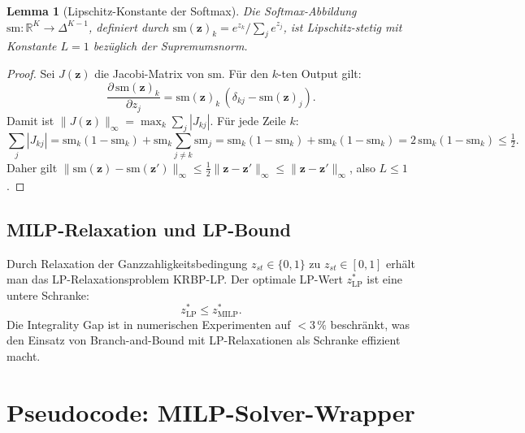 ﻿\documentclass[12pt,a4paper]{article}
\theoremstyle{plain}
\newtheorem{lemma}[theorem]{Lemma}
\theoremstyle{definition}
\begin{document}
	\begin{lemma}[Lipschitz-Konstante der Softmax]
		Die Softmax-Abbildung $\mathrm{sm} : \mathbb{R}^K \to \Delta^{K-1}$,
		definiert durch $\mathrm{sm}(\mathbf{z})_k = e^{z_k} / \sum_j e^{z_j}$,
		ist Lipschitz-stetig mit Konstante $L = 1$ bezüglich der Supremumsnorm.
	\end{lemma}
	
	\begin{proof}
		Sei $J(\mathbf{z})$ die Jacobi-Matrix von $\mathrm{sm}$. Für den
		$k$-ten Output gilt:
		\[
		\frac{\partial \,\mathrm{sm}(\mathbf{z})_k}{\partial z_j} =
		\mathrm{sm}(\mathbf{z})_k\,(\delta_{kj} - \mathrm{sm}(\mathbf{z})_j).
		\]
		Damit ist $\|J(\mathbf{z})\|_\infty = \max_k \sum_j |J_{kj}|$.
		Für jede Zeile $k$:
		\[
		\sum_j |J_{kj}| = \mathrm{sm}_k(1 - \mathrm{sm}_k) +
		\mathrm{sm}_k\sum_{j \neq k} \mathrm{sm}_j
		= \mathrm{sm}_k(1 - \mathrm{sm}_k) + \mathrm{sm}_k(1 - \mathrm{sm}_k)
		= 2\,\mathrm{sm}_k(1-\mathrm{sm}_k) \leq \tfrac{1}{2}.
		\]
		Daher gilt $\|\mathrm{sm}(\mathbf{z}) - \mathrm{sm}(\mathbf{z}')\|_\infty
		\leq \tfrac{1}{2}\|\mathbf{z} - \mathbf{z}'\|_\infty \leq
		\|\mathbf{z} - \mathbf{z}'\|_\infty$, also $L \leq 1$.
	\end{proof}
	
	\subsection{MILP-Relaxation und LP-Bound}
	
	Durch Relaxation der Ganzzahligkeitsbedingung $z_{st} \in \{0,1\}$ zu
	$z_{st} \in [0,1]$ erhält man das LP-Relaxationsproblem KRBP-LP.
	Der optimale LP-Wert $z^*_{\mathrm{LP}}$ ist eine untere Schranke:
	\[
	z^*_{\mathrm{LP}} \leq z^*_{\mathrm{MILP}}.
	\]
	Die Integrality Gap ist in numerischen Experimenten auf $< 3\,\%$
	beschränkt, was den Einsatz von Branch-and-Bound mit LP-Relaxationen
	als Schranke effizient macht.
	
	\section{Pseudocode: MILP-Solver-Wrapper}
	
\end{document}

